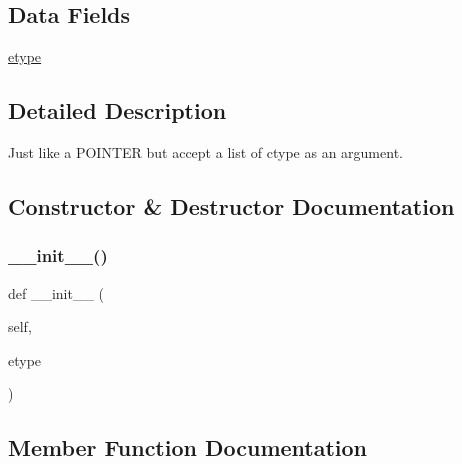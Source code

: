 \subsection*{Data Fields}
\begin{DoxyCompactItemize}
\item 
\hyperlink{classvlc_1_1_list_p_o_i_n_t_e_r_ac771a20ee94453196998b6165dda15b3}{etype}
\end{DoxyCompactItemize}


\subsection{Detailed Description}
\begin{DoxyVerb}Just like a POINTER but accept a list of ctype as an argument.
\end{DoxyVerb}
 

\subsection{Constructor \& Destructor Documentation}
\mbox{\label{classvlc_1_1_list_p_o_i_n_t_e_r_a26393747be6afa8ac347099f7fe4bc9c}} 
\subsubsection{\texorpdfstring{\+\_\+\+\_\+init\+\_\+\+\_\+()}{\_\_init\_\_()}}
{\footnotesize\ttfamily def \+\_\+\+\_\+init\+\_\+\+\_\+ (\begin{DoxyParamCaption}\item[{}]{self,  }\item[{}]{etype }\end{DoxyParamCaption})}



\subsection{Member Function Documentation}
\mbox{\label{classvlc_1_1_list_p_o_i_n_t_e_r_acfdaf9d0a20d3fd0e7e16ea1750abb7d}} 
